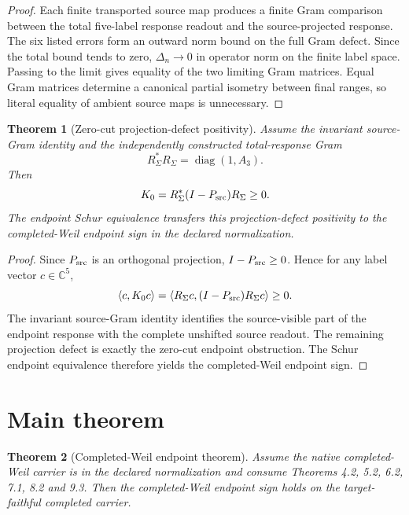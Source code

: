 \documentclass[11pt]{article}
\newtheorem{theorem}{Theorem}[section]
\newcommand{\C}{\mathbb C}
\newcommand{\Psrc}{P_{\rm src}}
\newcommand{\RSigma}{R_\Sigma}
\newcommand{\diag}{\operatorname{diag}}
\begin{document}
\begin{proof}
Each finite transported source map produces a finite Gram comparison between the total five-label response readout and the source-projected response.  The six listed errors form an outward norm bound on the full Gram defect.  Since the total bound tends to zero, \(\Delta_n\to0\) in operator norm on the finite label space.  Passing to the limit gives equality of the two limiting Gram matrices.  Equal Gram matrices determine a canonical partial isometry between final ranges, so literal equality of ambient source maps is unnecessary.
\end{proof}

\begin{theorem}[Zero-cut projection-defect positivity]
Assume the invariant source-Gram identity and the independently constructed total-response Gram
\[
\RSigma^*\RSigma=\diag(1,A_3).
\]
Then
\[
K_0=\RSigma^*(I-\Psrc)\RSigma\ge0.
\]
The endpoint Schur equivalence transfers this projection-defect positivity to the completed-Weil endpoint sign in the declared normalization.
\end{theorem}

\begin{proof}
Since \(\Psrc\) is an orthogonal projection, \(I-\Psrc\ge0\).  Hence for any label vector \(c\in\C^5\),
\[
\langle c,K_0c\rangle
=
\langle \RSigma c,(I-\Psrc)\RSigma c\rangle\ge0.
\]
The invariant source-Gram identity identifies the source-visible part of the endpoint response with the complete unshifted source readout.  The remaining projection defect is exactly the zero-cut endpoint obstruction.  The Schur endpoint equivalence therefore yields the completed-Weil endpoint sign.
\end{proof}

\section{Main theorem}

\begin{theorem}[Completed-Weil endpoint theorem]
Assume the native completed-Weil carrier is in the declared normalization and consume Theorems 4.2, 5.2, 6.2, 7.1, 8.2 and 9.3.  Then the completed-Weil endpoint sign holds on the target-faithful completed carrier.
\end{theorem}
\end{document}
